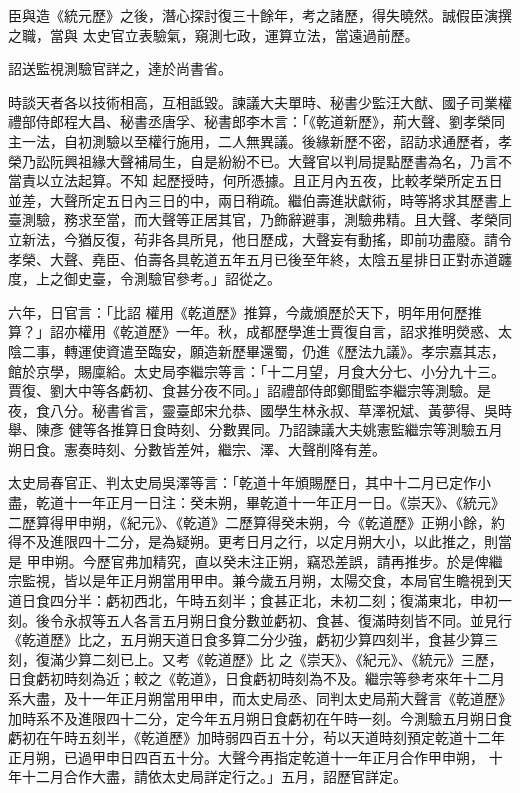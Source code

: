 \begin{pinyinscope}
 臣與造《統元歷》之後，潛心探討復三十餘年，考之諸歷，得失曉然。誠假臣演撰之職，當與
 太史官立表驗氣，窺測七政，運算立法，當遠過前歷。



 詔送監視測驗官詳之，達於尚書省。



 時談天者各以技術相高，互相詆毀。諫議大夫單時、秘書少監汪大猷、國子司業權禮部侍郎程大昌、秘書丞唐孚、秘書郎李木言：「《乾道新歷》，荊大聲、劉孝榮同主一法，自初測驗以至權行施用，二人無異議。後緣新歷不密，詔訪求通歷者，孝榮乃訟阮興祖緣大聲補局生，自是紛紛不已。大聲官以判局提點歷書為名，乃言不當責以立法起算。不知
 起歷授時，何所憑據。且正月內五夜，比較孝榮所定五日並差，大聲所定五日內三日的中，兩日稍疏。繼伯壽進狀獻術，時等將求其歷書上臺測驗，務求至當，而大聲等正居其官，乃飾辭避事，測驗弗精。且大聲、孝榮同立新法，今猶反復，茍非各具所見，他日歷成，大聲妄有動搖，即前功盡廢。請令孝榮、大聲、堯臣、伯壽各具乾道五年五月已後至年終，太陰五星排日正對赤道躔度，上之御史臺，令測驗官參考。」詔從之。



 六年，日官言：「比詔
 權用《乾道歷》推算，今歲頒歷於天下，明年用何歷推算？」詔亦權用《乾道歷》一年。秋，成都歷學進士賈復自言，詔求推明熒惑、太陰二事，轉運使資遣至臨安，願造新歷畢還蜀，仍進《歷法九議》。孝宗嘉其志，館於京學，賜廩給。太史局李繼宗等言：「十二月望，月食大分七、小分九十三。賈復、劉大中等各虧初、食甚分夜不同。」詔禮部侍郎鄭聞監李繼宗等測驗。是夜，食八分。秘書省言，靈臺郎宋允恭、國學生林永叔、草澤祝斌、黃夢得、吳時舉、陳彥
 健等各推算日食時刻、分數異同。乃詔諫議大夫姚憲監繼宗等測驗五月朔日食。憲奏時刻、分數皆差舛，繼宗、澤、大聲削降有差。



 太史局春官正、判太史局吳澤等言：「乾道十年頒賜歷日，其中十二月已定作小盡，乾道十一年正月一日注：癸未朔，畢乾道十一年正月一日。《崇天》、《統元》二歷算得甲申朔，《紀元》、《乾道》二歷算得癸未朔，今《乾道歷》正朔小餘，約得不及進限四十二分，是為疑朔。更考日月之行，以定月朔大小，以此推之，則當是
 甲申朔。今歷官弗加精究，直以癸未注正朔，竊恐差誤，請再推步。於是俾繼宗監視，皆以是年正月朔當用甲申。兼今歲五月朔，太陽交食，本局官生瞻視到天道日食四分半：虧初西北，午時五刻半；食甚正北，未初二刻；復滿東北，申初一刻。後令永叔等五人各言五月朔日食分數並虧初、食甚、復滿時刻皆不同。並見行《乾道歷》比之，五月朔天道日食多算二分少強，虧初少算四刻半，食甚少算三刻，復滿少算二刻已上。又考《乾道歷》比
 之《崇天》、《紀元》、《統元》三歷，日食虧初時刻為近；較之《乾道》，日食虧初時刻為不及。繼宗等參考來年十二月系大盡，及十一年正月朔當用甲申，而太史局丞、同判太史局荊大聲言《乾道歷》加時系不及進限四十二分，定今年五月朔日食虧初在午時一刻。今測驗五月朔日食虧初在午時五刻半，《乾道歷》加時弱四百五十分，茍以天道時刻預定乾道十二年正月朔，已過甲申日四百五十分。大聲今再指定乾道十一年正月合作甲申朔，
 十年十二月合作大盡，請依太史局詳定行之。」五月，詔歷官詳定。




\end{pinyinscope}
